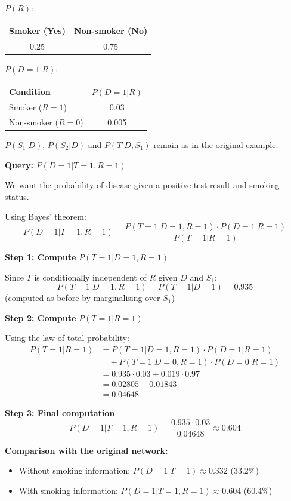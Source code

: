 \begin{examplebox}
\begin{example}
$P(R)$:
\begin{center}
\begin{tabular}{cc}
\toprule
Smoker (Yes) & Non-smoker (No) \\
\midrule
0.25 & 0.75 \\
\bottomrule
\end{tabular}
\end{center}
$P(D=1|R)$:
\begin{center}
\begin{tabular}{lc}
\toprule
Condition & $P(D=1|R)$ \\
\midrule
Smoker ($R=1$) & 0.03 \\
Non-smoker ($R=0$) & 0.005 \\
\bottomrule
\end{tabular}
\end{center}
$P(S_1|D)$, $P(S_2|D)$ and $P(T|D, S_1)$ remain as in the original example.

\textbf{Query: } $P(D=1|T=1, R=1)$

We want the probability of disease given a positive test result and smoking status.

Using Bayes' theorem:
$$P(D=1|T=1, R=1) = \frac{P(T=1|D=1, R=1) \cdot P(D=1|R=1)}{P(T=1|R=1)}$$

\textbf{Step 1: Compute} $P(T=1|D=1, R=1)$

Since $T$ is conditionally independent of $R$ given $D$ and $S_1$:
$$P(T=1|D=1, R=1) = P(T=1|D=1) = 0.935$$
(computed as before by marginalising over $S_1$)

\textbf{Step 2: Compute} $P(T=1|R=1)$

Using the law of total probability:
\begin{align*}
P(T=1|R=1) &= P(T=1|D=1, R=1) \cdot P(D=1|R=1) \\
&\quad + P(T=1|D=0, R=1) \cdot P(D=0|R=1) \\
&= 0.935 \cdot 0.03 + 0.019 \cdot 0.97 \\
&= 0.02805 + 0.01843 \\
&= 0.04648
\end{align*}

\textbf{Step 3: Final computation}
$$P(D=1|T=1, R=1) = \frac{0.935 \cdot 0.03}{0.04648} \approx 0.604$$

\textbf{Comparison with the original network:}
\begin{itemize}
\item Without smoking information: $P(D=1|T=1) \approx 0.332$ (33.2\%)
\item With smoking information: $P(D=1|T=1, R=1) \approx 0.604$ (60.4\%)
\end{itemize}


\end{example}
\end{examplebox}
